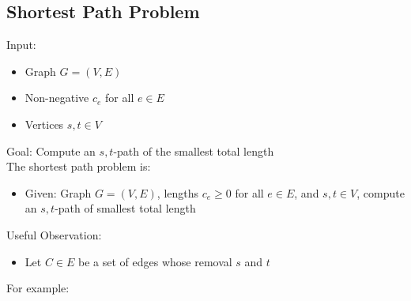 \documentclass[letterpaper, 12pt]{article}
\newcommand{\red}[1]{{\color{red}{#1}}}
\begin{document}
    \subsection{Shortest Path Problem}

    Input:\\
    \begin{itemize}
        \item Graph $G = (V,E)$
        \item Non-negative \red{edge lengts} $c_e$ for all $e \in E$
        \item Vertices $s,t \in V$
    \end{itemize}

    Goal: Compute an $s,t$-path of the smallest total length\\

    \bigskip
    The shortest path problem is:
    \begin{itemize}
        \item Given: Graph $G = (V,E)$, lengths $c_e \geq 0$ for all $e \in E$, and $s,t \in V$, compute an $s,t$-path of smallest total length
    \end{itemize}
    
    Useful Observation:\\
    \begin{itemize}
        \item Let $C \in E$ be a set of edges whose removal \red{disconnects} $s$ and $t$
    \end{itemize}
    
    For example:\\
    
    \begin{center}
    \end{center}
\end{document}
